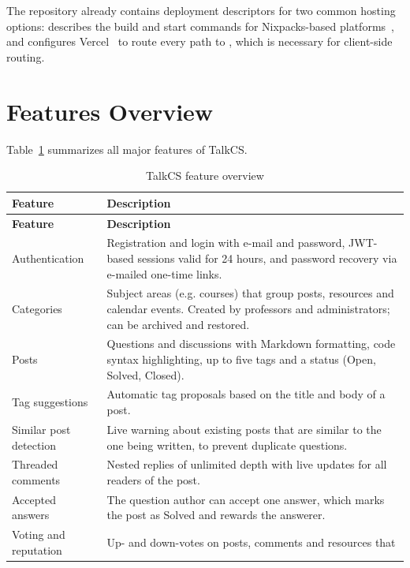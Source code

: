 The repository already contains deployment descriptors for two common hosting
options:  describes the build and start commands for
Nixpacks-based platforms~\cite{nixpacks}, and  configures Vercel~\cite{vercel}
to route every path to , which is necessary for client-side routing.

\section{Features Overview}

Table~\ref{tab:features} summarizes all major features of TalkCS.

\begin{longtable}{@{}p{} >{\raggedright\arraybackslash}p{}@{}}
  \toprule
  \textbf{Feature} & \textbf{Description} \\
  \midrule
  \endfirsthead
  \toprule
  \textbf{Feature} & \textbf{Description} \\
  \midrule
  \endhead
  \bottomrule
  \endfoot
  \bottomrule
  \caption{TalkCS feature overview}
  \label{tab:features}
  \endlastfoot
  Authentication & Registration and login with e-mail and password, JWT-based
    sessions valid for 24 hours, and password recovery via e-mailed one-time links. \\
  Categories & Subject areas (e.g. courses) that group posts, resources and calendar
    events. Created by professors and administrators; can be archived and restored. \\
  Posts & Questions and discussions with Markdown formatting, code syntax highlighting,
    up to five tags and a status (Open, Solved, Closed). \\
  Tag suggestions & Automatic tag proposals based on the title and body of a post. \\
  Similar post detection & Live warning about existing posts that are similar to the
    one being written, to prevent duplicate questions. \\
  Threaded comments & Nested replies of unlimited depth with live updates for all
    readers of the post. \\
  Accepted answers & The question author can accept one answer, which marks the post as
    Solved and rewards the answerer. \\
  Voting and reputation & Up- and down-votes on posts, comments and resources that

\end{longtable}
